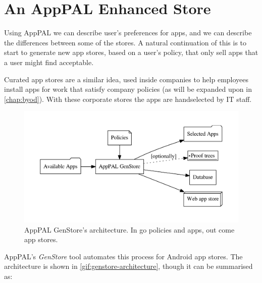 \documentclass[thesis.tex]{subfiles}
\begin{document}
\section{An AppPAL Enhanced Store}

Using AppPAL we can describe user's preferences for apps, and we can describe
the differences between some of the stores.  A natural continuation of this is
to start to generate new app stores, based on a user's policy, that only sell
apps that a user might find acceptable.

Curated app stores are a similar idea, used inside companies to help employees
install apps for work that satisfy company policies (as will be expanded upon
in \autoref{chap:byod}).  With these corporate stores the apps are handselected
by IT staff.  

\begin{figure}\centering
  \includegraphics[width=\textwidth]{figures/genstore.pdf}
  \caption[AppPAL GenStore's architecture.]{AppPAL GenStore's architecture.  In go policies and apps, out come app stores.}
  \label{fig:genstore-architecture}
\end{figure}

AppPAL's \emph{GenStore} tool automates this process for Android app stores.  The architecture is shown in \autoref{gif:genstore-architecture}, though it can be summarised as:
\end{document}
